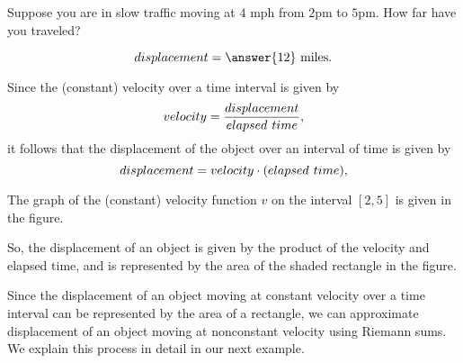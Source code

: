 \documentclass{ximera}
\begin{document}
\begin{question}
   Suppose you are in slow traffic moving at $4$ \textrm{mph} from
   $2$pm to $5$pm.  How far have you traveled?
   \begin{prompt}
     \[
    displacement= \answer{12}\ \text{miles}.
     \]
   \end{prompt}
   \begin{feedback}
    Since the (constant) velocity over a time interval is given by
    \[
      velocity=\frac{displacement}{elapsed\hspace{0.05in} time},
      \]
it follows that the displacement of the object over an interval of time is given by
\[
     displacement=velocity\cdot (elapsed\hspace{0.05in} time),
      \]  
      
         The graph of the (constant) velocity function $v$ on the interval $[2,5]$ is given in the figure.
      \begin{image}
\end{image}

      So, the displacement of an object is given by the product of the  velocity and elapsed time, and is represented by the area of the shaded rectangle in the figure. 
      \end{feedback}
        \end{question}
      Since the displacement of an object moving at constant velocity over a time interval can be represented by the area of a rectangle, we can approximate displacement of an object moving  at nonconstant velocity using Riemann sums. 
      We explain this process in detail in our next example.
\end{document}
